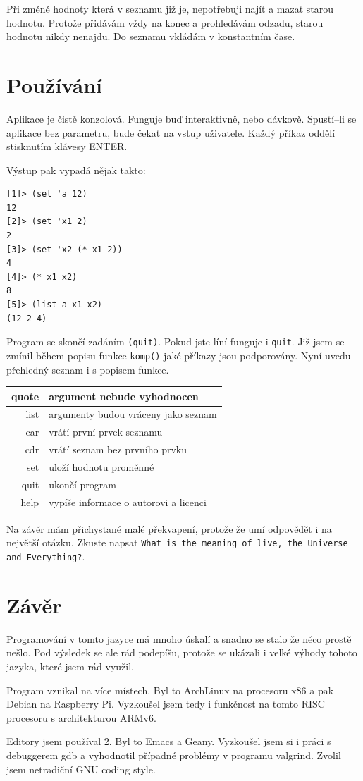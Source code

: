 \documentclass[a4paper, 12pt]{article}
\begin{document}
Při změně hodnoty která v seznamu již je, nepotřebuji najít a mazat
starou hodnotu. Protože přidávám vždy na konec a prohledávám odzadu,
starou hodnotu nikdy nenajdu. Do seznamu vkládám v konstantním
čase.

\section{Používání}
Aplikace je čistě konzolová. Funguje buď interaktivně, nebo
dávkově. Spustí--li se aplikace bez parametru, bude čekat
na vstup uživatele. Každý příkaz oddělí stisknutím
klávesy ENTER.

Výstup pak vypadá nějak takto:
\begin{verbatim}
[1]> (set 'a 12)
12
[2]> (set 'x1 2)
2
[3]> (set 'x2 (* x1 2))
4
[4]> (* x1 x2)
8
[5]> (list a x1 x2)
(12 2 4)
\end{verbatim}

Program se skončí zadáním \texttt{(quit)}. Pokud jste líní
funguje i \texttt{quit}. Již jsem se zmínil během popisu
funkce \texttt{komp()} jaké příkazy jsou podporovány.
Nyní uvedu přehledný seznam i s popisem funkce.

\begin{tabular}{|r|l|}
\hline
quote & argument nebude vyhodnocen\\ \hline
list & argumenty budou vráceny jako seznam\\ \hline
car & vrátí první prvek seznamu\\ \hline
cdr & vrátí seznam bez prvního prvku\\ \hline
set & uloží hodnotu proměnné\\ \hline
quit & ukončí program\\ \hline
help & vypíše informace o autorovi a licenci\\
\hline
\end{tabular}

Na závěr mám přichystané malé překvapení, protože že umí
odpovědět i na největší otázku. Zkuste napsat
\texttt{What is the meaning of live, the Universe
and Everything?}.

\section{Závěr}
Programování v tomto jazyce má
mnoho úskalí a snadno se stalo že něco prostě nešlo. Pod výsledek se
ale rád podepíšu, protože se ukázali i velké výhody tohoto jazyka, které
jsem rád využil.

Program vznikal na více místech. Byl to ArchLinux na procesoru x86 a
pak Debian na Raspberry Pi. Vyzkoušel jsem tedy i funkčnost na tomto
RISC procesoru s architekturou ARMv6.

Editory jsem používal 2. Byl to Emacs a Geany. Vyzkoušel jsem si
i práci s debuggerem \textsf{gdb} a vyhodnotil případné problémy
v programu \textsf{valgrind}. Zvolil jsem netradiční GNU coding style.

\nocite{wiki:cpro}
\nocite{pred:c}

\end{document}
